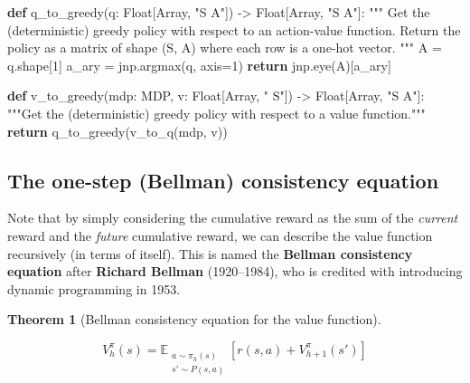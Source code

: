 \documentclass[
  letterpaper,
  DIV=11,
  numbers=noendperiod]{scrreprt}
\newenvironment{Shaded}{\begin{snugshade}}{\end{snugshade}}
\newcommand{\CommentTok}[1]{\textcolor[rgb]{0.37,0.37,0.37}{#1}}
\newcommand{\ControlFlowTok}[1]{\textcolor[rgb]{0.00,0.23,0.31}{\textbf{#1}}}
\newcommand{\DecValTok}[1]{\textcolor[rgb]{0.68,0.00,0.00}{#1}}
\newcommand{\KeywordTok}[1]{\textcolor[rgb]{0.00,0.23,0.31}{\textbf{#1}}}
\newcommand{\NormalTok}[1]{\textcolor[rgb]{0.00,0.23,0.31}{#1}}
\newcommand{\OperatorTok}[1]{\textcolor[rgb]{0.37,0.37,0.37}{#1}}
\newcommand{\StringTok}[1]{\textcolor[rgb]{0.13,0.47,0.30}{#1}}
\theoremstyle{plain}
\theoremstyle{plain}
\newtheorem{theorem}{Theorem}[chapter]
\theoremstyle{definition}
\theoremstyle{definition}
\theoremstyle{remark}
\begin{document}
\begin{Shaded}
\begin{Highlighting}[]
\KeywordTok{def}\NormalTok{ q\_to\_greedy(q: Float[Array, }\StringTok{"S A"}\NormalTok{]) }\OperatorTok{{-}\textgreater{}}\NormalTok{ Float[Array, }\StringTok{"S A"}\NormalTok{]:}
    \CommentTok{"""}
\CommentTok{    Get the (deterministic) greedy policy with respect to an action{-}value function.}
\CommentTok{    Return the policy as a matrix of shape (S, A) where each row is a one{-}hot vector.}
\CommentTok{    """}
\NormalTok{    A }\OperatorTok{=}\NormalTok{ q.shape[}\DecValTok{1}\NormalTok{]}
\NormalTok{    a\_ary }\OperatorTok{=}\NormalTok{ jnp.argmax(q, axis}\OperatorTok{=}\DecValTok{1}\NormalTok{)}
    \ControlFlowTok{return}\NormalTok{ jnp.eye(A)[a\_ary]}


\KeywordTok{def}\NormalTok{ v\_to\_greedy(mdp: MDP, v: Float[Array, }\StringTok{" S"}\NormalTok{]) }\OperatorTok{{-}\textgreater{}}\NormalTok{ Float[Array, }\StringTok{"S A"}\NormalTok{]:}
    \CommentTok{"""Get the (deterministic) greedy policy with respect to a value function."""}
    \ControlFlowTok{return}\NormalTok{ q\_to\_greedy(v\_to\_q(mdp, v))}
\end{Highlighting}
\end{Shaded}

\subsection{The one-step (Bellman) consistency
equation}\label{the-one-step-bellman-consistency-equation}

Note that by simply considering the cumulative reward as the sum of the
\emph{current} reward and the \emph{future} cumulative reward, we can
describe the value function recursively (in terms of itself). This is
named the \textbf{Bellman consistency equation} after \textbf{Richard
Bellman} (1920--1984), who is credited with introducing dynamic
programming in 1953.

\begin{theorem}[Bellman consistency equation for the value
function]\protect\hypertarget{thm-bellman_consistency}{}\label{thm-bellman_consistency}

\[
V_h^\pi(s) = \mathbb{E}_{\substack{a \sim \pi_h(s) \\ s' \sim P(s, a)}} [r(s, a) + V_{h+1}^\pi(s')]
\]

\end{theorem}
\end{document}
